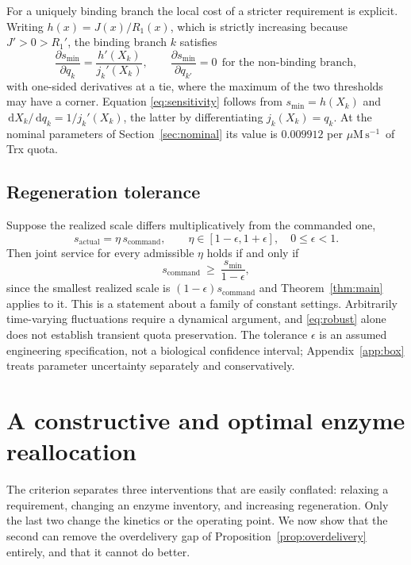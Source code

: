 \documentclass[11pt,a4paper]{article}
\theoremstyle{plain}
\theoremstyle{definition}
\theoremstyle{remark}
\newcommand{\fluxunit}{\ensuremath{\mu\mathrm{M}\,\mathrm{s}^{-1}}}
\newcommand{\dd}{\,\mathrm d}
\begin{document}
For a uniquely binding branch the local cost of a stricter requirement is
explicit. Writing $h(x)=J(x)/R_1(x)$, which is strictly increasing because
$J'>0>R_1'$, the binding branch $k$ satisfies
\begin{equation}\label{eq:sensitivity}
  \frac{\partial s_{\min}}{\partial q_k}=\frac{h'(X_k)}{j_k'(X_k)},
  \qquad
  \frac{\partial s_{\min}}{\partial q_{k'}}=0\ \ \text{for the non-binding branch},
\end{equation}
with one-sided derivatives at a tie, where the maximum of the two thresholds may
have a corner. Equation \eqref{eq:sensitivity} follows from
$s_{\min}=h(X_k)$ and $\dd X_k/\dd q_k=1/j_k'(X_k)$, the latter by differentiating
$j_k(X_k)=q_k$. At the nominal parameters of Section~\ref{sec:nominal} its value is
$0.009912$ per \fluxunit\ of Trx quota.

\subsection{Regeneration tolerance}\label{sec:tolerance}

Suppose the realized scale differs multiplicatively from the commanded one,
\[
  s_{\mathrm{actual}}=\eta\,s_{\mathrm{command}},\qquad
  \eta\in[1-\epsilon,1+\epsilon],\quad 0\le\epsilon<1 .
\]
Then joint service for every admissible $\eta$ holds if and only if
\begin{equation}\label{eq:robust}
  s_{\mathrm{command}}\ \ge\ \frac{s_{\min}}{1-\epsilon},
\end{equation}
since the smallest realized scale is $(1-\epsilon)s_{\mathrm{command}}$ and
Theorem~\ref{thm:main} applies to it. This is a statement about a family of
constant settings. Arbitrarily time-varying fluctuations require a dynamical
argument, and \eqref{eq:robust} alone does not establish transient quota
preservation. The tolerance $\epsilon$ is an assumed engineering specification,
not a biological confidence interval; Appendix~\ref{app:box} treats parameter
uncertainty separately and conservatively.

\section{A constructive and optimal enzyme reallocation}\label{sec:redesign}

The criterion separates three interventions that are easily conflated: relaxing a
requirement, changing an enzyme inventory, and increasing regeneration. Only the
last two change the kinetics or the operating point. We now show that the second
can remove the overdelivery gap of Proposition~\ref{prop:overdelivery} entirely,
and that it cannot do better.
\end{document}

